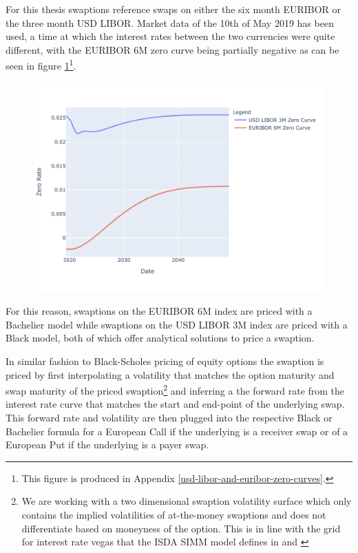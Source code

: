 \documentclass[../Thesis_AHoecherl.tex]{subfiles}
\begin{document}
    For this thesis swaptions reference swaps on either the six month EURIBOR or the three month USD LIBOR.
    Market data of the 10th of May 2019 has been used, a time at which the interest rates between the two currencies were quite different, with the EURIBOR 6M zero curve being partially negative as can be seen in figure \ref{fig:EURIBOR and LIBOR forward curve}\footnote{This figure is produced in Appendix \ref{usd-libor-and-euribor-zero-curves}.}.

    \begin{figure}
        \centering
        \includegraphics{Graphics/EURIBOR_and_LIBOR_curve.pdf}
        \caption{}
        \label{fig:EURIBOR and LIBOR forward curve}
    \end{figure}

    For this reason, swaptions on the EURIBOR 6M index are priced with a Bachelier model while swaptions on the USD LIBOR 3M index are priced with a Black model, both of which offer analytical solutions to price a swaption.

    In similar fashion to Black-Scholes pricing of equity options the swaption is priced by first interpolating a volatility that matches the option maturity and swap maturity of the priced swaption\footnote{We are working with a two dimensional swaption volatility surface which only contains the implied volatilities of at-the-money swaptions and does not differentiate based on moneyness of the option. This is in line with the grid for interest rate vegas that the \gls{ISDA SIMM} model defines in \cite[Section 2.8]{RiskDataStandard} and \cite[Point 10]{SIMM}} and inferring a the forward rate from the interest rate curve that matches the start and end-point of the underlying swap.
    This forward rate and volatility are then plugged into the respective Black or Bachelier formula for a European Call if the underlying is a receiver swap or of a European Put if the underlying is a payer swap.
\end{document}

